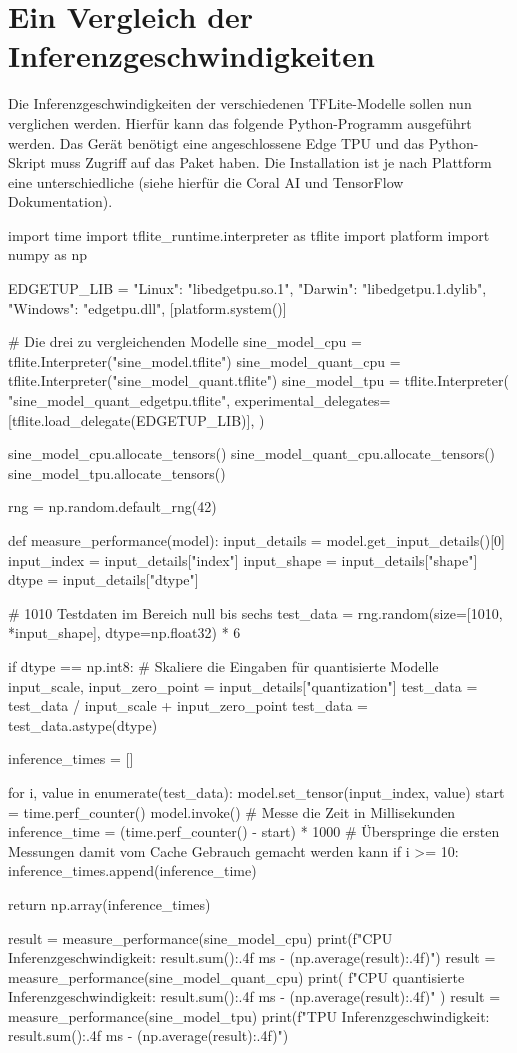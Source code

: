 \section{Ein Vergleich der Inferenzgeschwindigkeiten}
Die Inferenzgeschwindigkeiten der verschiedenen TFLite-Modelle
sollen nun verglichen werden. Hierfür kann das folgende Python-Programm
ausgeführt werden.
Das Gerät benötigt eine angeschlossene Edge TPU
und das Python-Skript muss Zugriff auf
das  Paket haben.
Die Installation ist je nach Plattform eine unterschiedliche
(siehe hierfür die Coral AI und TensorFlow Dokumentation).
\begin{pythoncode}
import time
import tflite_runtime.interpreter as tflite
import platform
import numpy as np

EDGETUP_LIB = {
    "Linux": "libedgetpu.so.1",
    "Darwin": "libedgetpu.1.dylib",
    "Windows": "edgetpu.dll",
}[platform.system()]

# Die drei zu vergleichenden Modelle
sine_model_cpu = tflite.Interpreter("sine_model.tflite")
sine_model_quant_cpu = tflite.Interpreter("sine_model_quant.tflite")
sine_model_tpu = tflite.Interpreter(
    "sine_model_quant_edgetpu.tflite",
    experimental_delegates=[tflite.load_delegate(EDGETUP_LIB)],
)

sine_model_cpu.allocate_tensors()
sine_model_quant_cpu.allocate_tensors()
sine_model_tpu.allocate_tensors()

rng = np.random.default_rng(42)

def measure_performance(model):
    input_details = model.get_input_details()[0]
    input_index = input_details["index"]
    input_shape = input_details["shape"]
    dtype = input_details["dtype"]

    # 1010 Testdaten im Bereich null bis sechs
    test_data = rng.random(size=[1010, *input_shape], dtype=np.float32) * 6

    if dtype == np.int8:
        # Skaliere die Eingaben für quantisierte Modelle
        input_scale, input_zero_point = input_details["quantization"]
        test_data = test_data / input_scale + input_zero_point
        test_data = test_data.astype(dtype)

    inference_times = []

    for i, value in enumerate(test_data):
        model.set_tensor(input_index, value)
        start = time.perf_counter()
        model.invoke()
        # Messe die Zeit in Millisekunden
        inference_time = (time.perf_counter() - start) * 1000
        # Überspringe die ersten Messungen damit vom Cache Gebrauch gemacht werden kann
        if i >= 10:
            inference_times.append(inference_time)

    return np.array(inference_times)

result = measure_performance(sine_model_cpu)
print(f"CPU Inferenzgeschwindigkeit: {result.sum():.4f} ms - ({np.average(result):.4f})")
result = measure_performance(sine_model_quant_cpu)
print(
  f"CPU quantisierte Inferenzgeschwindigkeit: {result.sum():.4f} ms - ({np.average(result):.4f})"
)
result = measure_performance(sine_model_tpu)
print(f"TPU Inferenzgeschwindigkeit: {result.sum():.4f} ms - ({np.average(result):.4f})")
\end{pythoncode}
